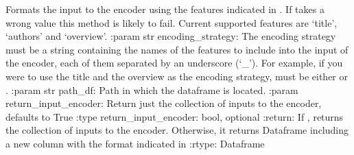 \documentclass[letterpaper,10pt,english]{sphinxmanual}
\begin{document}

\begin{fulllineitems}
\label{\detokenize{code:code_utils.utils.prepare_input_encoder}}
Formats the input to the encoder using the features indicated in
. If  takes a wrong value this method
is likely to fail. Current supported features are ‘title’, ‘authors’ and
‘overview’.
:param str encoding\_strategy: The encoding strategy must be a string containing
the names of the features to include into the input of the encoder, each of them
separated by an underscore (‘\_’). For example, if you were to use the title and
the overview as the encoding strategy,  must be either
 or .
:param str path\_df: Path in which the dataframe is located.
:param return\_input\_encoder: Return just the collection of inputs to the encoder,
defaults to True
:type return\_input\_encoder: bool, optional
:return: If , returns the collection of inputs to the encoder.
Otherwise, it returns Dataframe including a new column  with the
format indicated in 
:rtype: Dataframe

\end{fulllineitems}

\end{document}
